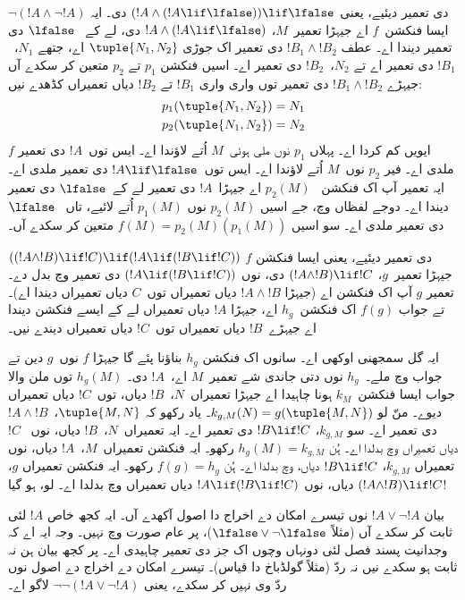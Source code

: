 \documentclass[../../../include/open-logic-section]{subfiles}
\begin{document}
\begin{ex}
$\lnot(!A \land \lnot !A)$ دی تعمیر دیئیے، یعنی $(!A
\land (!A \lif \lfalse)) \lif \lfalse$ دی۔ ایہ ایسا فنکشن~$f$
اے جیہڑا تعمیر~$M$، $!A \land (!A \lif \lfalse)$ دی، لے کے
~$\lfalse$ دی تعمیر دیندا اے۔ عطف $!B_1 \land !B_2$ دی تعمیر اک
جوڑی $\tuple{N_1, N_2}$ اے، جتھے $N_1$،~$!B_1$ دی تعمیر اے
تے $N_2$،~$!B_2$ دی تعمیر اے۔ اسیں فنکشن $p_1$ تے $p_2$ متعین
کر سکدے آں جیہڑے $!B_1 \land !B_2$ دی تعمیر توں واری واری
$!B_1$ تے $!B_2$ دیاں تعمیراں کڈھدے نیں:
\begin{align*}
  p_1(\tuple{N_1, N_2}) &= N_1\\
  p_2(\tuple{N_1, N_2}) &= N_2
\end{align*}
$f$ ایویں کم کردا اے۔ پہلاں $p_1$ نوں ملی ہوئی~$M$ اُتے لاؤندا اے۔
ایس توں~$!A$ دی تعمیر ملدی اے۔ فیر $p_2$ نوں~$M$ اُتے لاؤندا اے۔
ایس توں~$!A \lif \lfalse$ دی تعمیر ملدی اے۔ ایہ تعمیر آپ اک فنکشن
~$p_2(M)$ اے جیہڑا~$!A$ دی تعمیر لے کے~$\lfalse$ دی تعمیر دیندا اے۔
دوجے لفظاں وچ، جے اسیں $p_2(M)$ نوں $p_1(M)$ اُتے لائیے، تاں
~$\lfalse$ دی تعمیر ملدی اے۔ سو اسیں $f(M) = p_2(M)(p_1(M))$
متعین کر سکدے آں۔
\end{ex}

\begin{ex}
$((!A \land !B) \lif !C) \lif (!A \lif
(!B \lif !C))$ دی تعمیر دیئیے، یعنی ایسا فنکشن $f$ جیہڑا تعمیر~$g$،
$(!A \land !B) \lif !C$ دی، نوں $(!A \lif (!B \lif
!C))$ دی تعمیر وچ بدل دے۔ تعمیر $g$ آپ اک فنکشن اے
(جیہڑا $!A \land !B$ دیاں تعمیراں توں~$C$ دیاں تعمیراں دیندا اے)۔
تے جواب $f(g)$ اک فنکشن~$h_g$ اے، جیہڑا $!A$ دیاں تعمیراں لے کے
ایسے فنکشن دیندا اے جیہڑے~$!B$ دیاں تعمیراں توں~$!C$ دیاں تعمیراں دیندے نیں۔

ایہ گل سمجھنی اوکھی اے۔ سانوں اک فنکشن $h_g$ بناؤنا پئے گا جیہڑا
$f$ نوں~$g$ دین تے جواب وچ ملے۔~$h_g$ نوں دتی جاندی شے تعمیر~$M$
اے،~$!A$ دی۔ $h_g(M)$ توں ملن والا جواب ایسا فنکشن~$k_M$
ہونا چاہیدا اے جیہڑا تعمیراں~$N$،~$!B$ دیاں، توں~$!C$ دیاں
تعمیراں دیوے۔ منّ لو $k_{g,M}(N) = g(\tuple{M, N})$۔ یاد رکھو
کہ $\tuple{M,
  N}$،~$!A \land !B$ دی تعمیر اے۔ سو $k_{g,M}$،
$!B \lif !C$ دی تعمیر اے۔ ایہ تعمیراں~$N$،~$!B$ دیاں، نوں
~$!C$ دیاں تعمیراں وچ بدلدا اے۔ ہُن $h_g(M) = k_{g,M}$ رکھو۔
ایہ فنکشن تعمیراں~$M$،~$!A$ دیاں، نوں تعمیراں $k_{g,M}$،
$!B \lif !C$ دیاں، وچ بدلدا اے۔ ہُن $f(g) = h_g$ رکھو۔
ایہ فنکشن تعمیراں $g$، $(!A \land !B) \lif !C$ دیاں، نوں
$!A \lif (!B \lif !C)$ دیاں تعمیراں وچ بدلدا اے۔ لو، ہو گیا!{}
\end{ex}

بیان $!A \lor \lnot !A$ نوں تیسرے امکان دے اخراج دا اصول آکھدے آں۔
ایہ کجھ خاص $!A$ لئی ثابت کر سکدے آں (مثلاً $\lfalse \lor
\lnot \lfalse$)، پر عام صورت وچ نہیں۔ وجہ ایہ اے کہ وجدانیت پسند
فصل لئی دونہاں وچوں اک جز دی تعمیر چاہیدی اے۔ پر کجھ بیان ہن نہ
ثابت ہو سکدے نیں نہ ردّ (مثلاً گولڈباخ دا قیاس)۔ تیسرے امکان دے
اخراج دے اصول نوں ردّ وی نہیں کر سکدے، یعنی $\lnot \lnot (!A
\lor \lnot !A)$ لاگو اے۔
\end{document}

